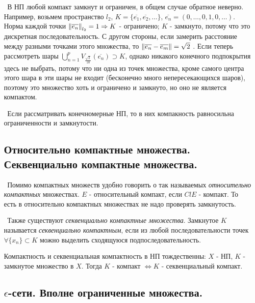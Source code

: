 \bigskip 
\noindent\textbullet~В НП любой компакт замкнут и ограничен, в общем случае обратное неверно. Например, возьмем пространство $l_2$, $K = \{ \overline{e_1}, \overline{e_2},
\dots\}$, $\overline{e_n} = (0, \dots, 0, 1, 0, \dots)$. Норма каждой точки $\left\lVert\overline{e_n}\right\rVert_{l_2} = 1 \Rightarrow K$ - ограничено; $K$ - замкнуто, потому что 
это дискретная последовательность. С другом стороны, если замерить расстояние между разными точками этого множества, то $\left\lVert\overline{e_n} - \overline{e_m}\right\rVert = \sqrt{2}$
. Если теперь рассмотреть шары $\bigcup_{n = 1}^p V_{\frac{\sqrt{2}}{10}}(\overline{e_n}) \supset K$, однако никакого конечного подпокрытия здесь не выбрать, потому что 
ни одна из точек множества, кроме самого центра этого шара в эти шары не входит (бесконечно много непересекающихся шаров), поэтому это множество хоть и ограничено и 
замкнуто, но оно не является компактом.

\smallskip
\noindent\textbullet~Если рассматривать конечномерные НП, то в них компакность равносильна ограниченности и замкнутости.


\subsection*{Относительно компактные множества. Секвенциально компактные множества.}

\noindent\textasteriskcentered~Помимо компактных множеств удобно говорить о так называемых \textit{относительно компактных} множествах. $E$ - относительный компакт, если 
$Cl E$ - компакт. То есть в относительно компактных множествах не надо проверять замкнутость.

\bigskip 
\noindent\textasteriskcentered~Также существуют \textit{секвенциально компактные множества}. Замкнутое $K$ называется \textit{секвенциально компактным}, если из любой 
последовательности точек $\forall \{ x_n \} \subset K$ можно выделить сходящуюся подпоследовательность. 

\begin{theorem*}
Компактность и секвенциальная компактность в НП тождественны: $X$ - НП, $K$ - замкнутое множество в $X$. Тогда $K$ - компакт $\Longleftrightarrow K$ - секвенциальный 
компакт.
\end{theorem*}


\subsection*{$\epsilon$-сети. Вполне ограниченные множества.}

